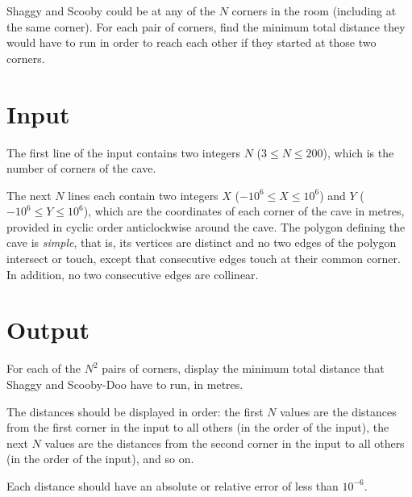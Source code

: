 Shaggy and Scooby could be at any of the $N$ corners in the room (including at the same corner). For each pair of corners, find the minimum total distance they would have to run in order to reach each other if they started at those two corners.


\section*{Input}

The first line of the input contains two integers $N$ ($3 \le N \le 200$), which is the number of corners of the cave.

The next $N$ lines each contain two integers $X$ ($-{10}^6 \le X \le {10}^6$) and $Y$ ($-{10}^6 \le Y \le {10}^6$), which are the coordinates of each corner of the cave in metres, provided in cyclic order anticlockwise around the cave. The polygon defining the cave is \textit{simple}, that is, its vertices are distinct and no two edges of the polygon intersect or touch, except that consecutive edges touch at their common corner. In addition, no two consecutive edges are collinear.


\section*{Output}

For each of the $N^2$ pairs of corners, display the minimum total distance that Shaggy and Scooby-Doo have to run, in metres.

The distances should be displayed in order: the first $N$ values are the distances from the first corner in the input to all others (in the order of the input), the next $N$ values are the distances from the second corner in the input to all others (in the order of the input), and so on.

Each distance should have an absolute or relative error of less than ${10}^{-6}$.
